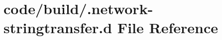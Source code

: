 \section{code/build/.network-\/stringtransfer.d File Reference}
\label{_8network-stringtransfer_8d}
